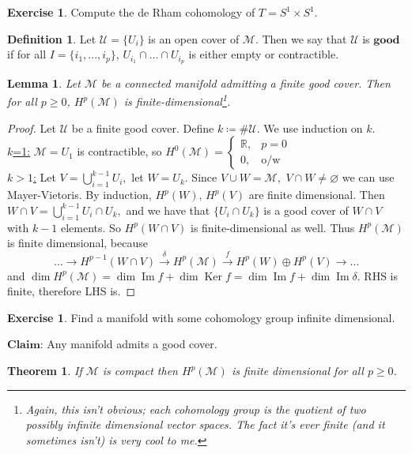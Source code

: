 \documentclass[10pt]{article}
\theoremstyle{plain}
\newtheorem{theorem}{Theorem}[section]
\newtheorem{lemma}[thm]{Lemma}
\theoremstyle{definition}
\newtheorem{defn}[thm]{Definition} %
\newtheorem{exercise}[thm]{Exercise}
\newcommand{\Claim}{\textbf{Claim: }}
\newcommand{\Real}{\mathbb{R}}
\newcommand{\man}{\mathcal{M}}
\newcommand{\allthe}[3]{{#1}_{#2},...,{#1}_{#3}}
\DeclareMathOperator{\Ker}{Ker}
\DeclareMathOperator{\Ima}{Im}
\newcommand{\cohomman}[1]{H^{#1}(\man)}
\newcommand{\cohom}[2]{H^{#1}(#2)}
\begin{document}
\begin{exercise}
Compute the de Rham cohomology of $T = S^1 \times S^1$.
\end{exercise} 
\begin{defn}
Let $\mathcal{U} = \{U_i\}$ is an open cover of $\man$. Then we say that $\mathcal{U}$ is $\textbf{good}$ if for all $I = \{\allthe{i}{1}{p}\}, \, U_{i_1} \cap \dots \cap U_{i_p}$ is either empty or contractible.
\end{defn}
\begin{lemma}
Let $\man$ be a connected manifold admitting a finite good cover. Then for all $p\geq 0$, $\cohomman{p}$ is finite-dimensional\footnote{Again, this isn't obvious; each cohomology group is the quotient of two possibly infinite dimensional vector spaces. The fact it's ever finite (and it sometimes isn't) is very cool to me.}.
\end{lemma}
\begin{proof}
Let $\mathcal{U}$ be a finite good cover. Define $k \coloneqq \# \mathcal{U}.$ We use induction on $k$.\\
\underline{$k$=1:} $\man = U_1$ is contractible, so $\cohomman{0} = \begin{cases} \Real,& p = 0 \\ 0, & \text{o/w} \end{cases}$\\
\underline{$k>1$:} Let $V = \bigcup\limits_{i=1}^{k-1} U_i,$ let $W =U_k $. Since $V\cup W = \man,$ $V\cap W \neq \varnothing$ we can use Mayer-Vietoris. By induction, $H^p(W), \, \cohom{p}{V}$ are finite dimensional. Then $W\cap V = \bigcup\limits_{i=1}^{k-1} U_i \cap U_k,$ and we have that $\{U_i \cap U_k\}$ is a good cover of $W\cap V$ with $k-1$ elements. So $\cohom{p}{W\cap V}$ is finite-dimensional as well. Thus $\cohomman{p}$ is finite dimensional, because
$$\dots \to \cohom{p-1}{W\cap V} \xrightarrow{\delta}\cohomman{p} \xrightarrow{f} \cohom{p}{W} \oplus \cohom{p}{V} \to \dots$$
and $\dim \cohomman{p} = \dim \Ima f + \dim \Ker f = \dim \Ima f + \dim \Ima \delta.$ RHS is finite, therefore LHS is.
\end{proof}
\begin{exercise}
Find a manifold with some cohomology group infinite dimensional.
\end{exercise}\noindent
$\Claim$Any manifold admits a good cover.
\begin{theorem}
If $\man$ is compact then $\cohomman{p}$ is finite dimensional for all $p\geq 0$.
\end{theorem}
\end{document}
